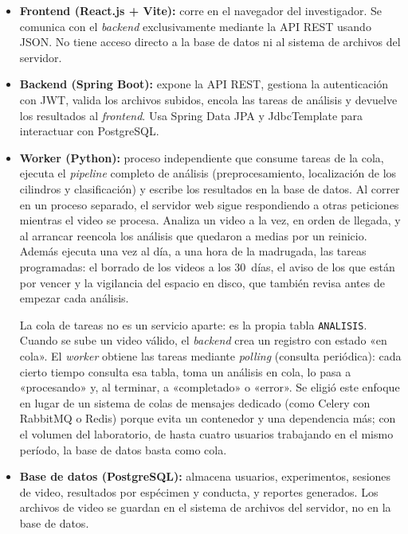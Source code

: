 \begin{itemize}
  \item \textbf{Frontend (React.js + Vite):} corre en el navegador del investigador.
        Se comunica con el \textit{backend} exclusivamente mediante la API REST usando JSON.
        No tiene acceso directo a la base de datos ni al sistema de archivos del
        servidor.

  \item \textbf{Backend (Spring Boot):} expone la API REST, gestiona la autenticación con
        JWT, valida los archivos subidos, encola las tareas de análisis y devuelve
        los resultados al \textit{frontend}. Usa Spring Data JPA y JdbcTemplate para interactuar con
        PostgreSQL.

  \item \textbf{Worker (Python):} proceso independiente que consume tareas de la
        cola, ejecuta el \textit{pipeline} completo de análisis (preprocesamiento, localización
        de los cilindros y clasificación) y escribe los resultados en la base de datos.
        Al correr en un proceso separado, el servidor web sigue respondiendo a
        otras peticiones mientras el video se procesa. Analiza un video a la vez, en
        orden de llegada, y al arrancar reencola los análisis que quedaron a medias
        por un reinicio. Además ejecuta una vez al día, a una hora de la madrugada,
        las tareas programadas: el borrado de los videos a los 30~días, el aviso de
        los que están por vencer y la vigilancia del espacio en disco, que también
        revisa antes de empezar cada análisis.

        La cola de tareas no es un servicio aparte: es la propia tabla
        \texttt{ANALISIS}. Cuando se sube un video válido, el \textit{backend} crea un
        registro con estado «en cola». El \textit{worker} obtiene las tareas mediante
        \textit{polling} (consulta periódica): cada cierto tiempo consulta esa tabla,
        toma un análisis en cola, lo pasa a «procesando» y, al terminar, a
        «completado» o «error». Se eligió este enfoque en lugar de un sistema de
        colas de mensajes dedicado (como Celery con RabbitMQ o Redis) porque evita
        un contenedor y una dependencia más; con el volumen del laboratorio, de
        hasta cuatro usuarios trabajando en el mismo período, la base de datos basta como cola.

  \item \textbf{Base de datos (PostgreSQL):} almacena usuarios, experimentos,
        sesiones de video, resultados por espécimen y conducta, y reportes generados.
        Los archivos de video se guardan en el sistema de archivos del servidor, no
        en la base de datos.
\end{itemize}

